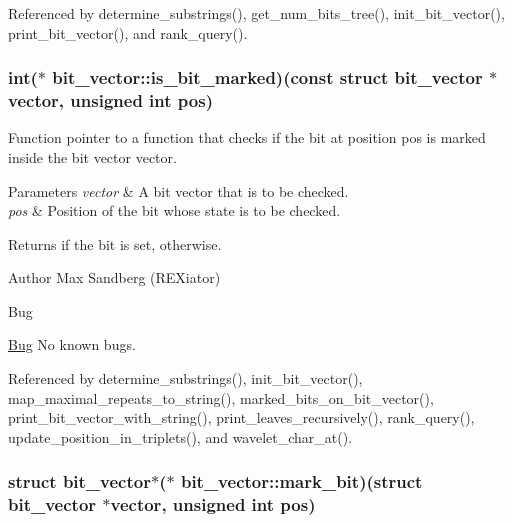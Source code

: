 \-Referenced by determine\-\_\-substrings(), get\-\_\-num\-\_\-bits\-\_\-tree(), init\-\_\-bit\-\_\-vector(), print\-\_\-bit\-\_\-vector(), and rank\-\_\-query().

\hypertarget{structbit__vector_ad8ffb52bc86612775cdca0d9d02dbf1a}{
\subsubsection[{is\-\_\-bit\-\_\-marked}]{\setlength{\rightskip}{0pt plus 5cm}int($\ast$ {\bf bit\-\_\-vector\-::is\-\_\-bit\-\_\-marked})(const struct {\bf bit\-\_\-vector} $\ast$vector, unsigned int pos)}}\label{structbit__vector_ad8ffb52bc86612775cdca0d9d02dbf1a}


\-Function pointer to a function that checks if the bit at position {\ttfamily pos} is marked inside the bit vector {\ttfamily vector}. 


\begin{DoxyParams}{\-Parameters}
{\em vector} & \-A bit vector that is to be checked. \\
\hline
{\em pos} & \-Position of the bit whose state is to be checked. \\
\hline
\end{DoxyParams}
\begin{DoxyReturn}{\-Returns}
{} if the bit is set, {} otherwise. 
\end{DoxyReturn}
\begin{DoxyAuthor}{\-Author}
\-Max \-Sandberg (\-R\-E\-Xiator) 
\end{DoxyAuthor}
\begin{DoxyRefDesc}{\-Bug}
\item[\hyperlink{bug__bug000112}{\-Bug}]\-No known bugs. \end{DoxyRefDesc}


\-Referenced by determine\-\_\-substrings(), init\-\_\-bit\-\_\-vector(), map\-\_\-maximal\-\_\-repeats\-\_\-to\-\_\-string(), marked\-\_\-bits\-\_\-on\-\_\-bit\-\_\-vector(), print\-\_\-bit\-\_\-vector\-\_\-with\-\_\-string(), print\-\_\-leaves\-\_\-recursively(), rank\-\_\-query(), update\-\_\-position\-\_\-in\-\_\-triplets(), and wavelet\-\_\-char\-\_\-at().

\hypertarget{structbit__vector_afa480cad95d28f925a48ef49a26f83d8}{
\subsubsection[{mark\-\_\-bit}]{\setlength{\rightskip}{0pt plus 5cm}struct {\bf bit\-\_\-vector}$\ast$($\ast$ {\bf bit\-\_\-vector\-::mark\-\_\-bit})(struct {\bf bit\-\_\-vector} $\ast$vector, unsigned int pos)}}\label{structbit__vector_afa480cad95d28f925a48ef49a26f83d8}


